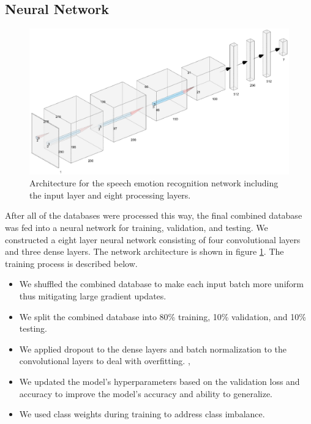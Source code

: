 \documentclass[conference]{IEEEtran}
\begin{document}
\subsection{Neural Network}

\begin{figure}[h!]
	\centering
	\hspace{6mm}
	\includegraphics[width=\textwidth]{neural_network_architecture.png}
	\caption{Architecture for the speech emotion recognition network including the input layer and eight processing layers.}
	\label{neuralNetworkArchitecture}
\end{figure}

After all of the databases were processed this way, the final combined database was fed into a neural network for training, validation, and testing. We constructed a eight layer neural network consisting of four convolutional layers and three dense layers. The network architecture is shown in figure \ref{neuralNetworkArchitecture}. The training process is described below.
\begin{itemize}
	\item We shuffled the combined database to make each input batch more uniform thus mitigating large gradient updates.
	\item We split the combined database into 80\% training, 10\% validation, and 10\% testing.
	\item We applied dropout to the dense layers and batch normalization to the convolutional layers to deal with overfitting. \cite{Srivastava2014}, \cite{Ioffe2015}
	\item We updated the model's hyperparameters based on the validation loss and accuracy to improve the model's accuracy and ability to generalize.
	\item We used class weights during training to address class imbalance.
\end{itemize}
\end{document}
